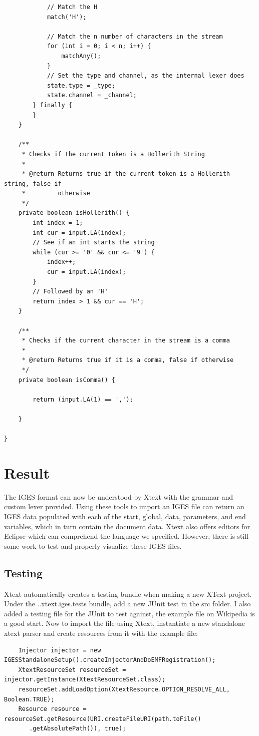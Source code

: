 \begin{Verbatim}
			// Match the H
			match('H');

			// Match the n number of characters in the stream
			for (int i = 0; i < n; i++) {
				matchAny();
			}
			// Set the type and channel, as the internal lexer does
			state.type = _type;
			state.channel = _channel;
		} finally {
		}
	}

	/**
	 * Checks if the current token is a Hollerith String
	 * 
	 * @return Returns true if the current token is a Hollerith string, false if
	 *         otherwise
	 */
	private boolean isHollerith() {
		int index = 1;
		int cur = input.LA(index);
		// See if an int starts the string
		while (cur >= '0' && cur <= '9') {
			index++;
			cur = input.LA(index);
		}
		// Followed by an 'H'
		return index > 1 && cur == 'H';
	}

	/**
	 * Checks if the current character in the stream is a comma
	 * 
	 * @return Returns true if it is a comma, false if otherwise
	 */
	private boolean isComma() {

		return (input.LA(1) == ',');

	}

}
\end{Verbatim}

\chapter{Result}

The IGES format can now be understood by Xtext with the grammar and custom lexer provided. Using these tools to import an IGES file can return an IGES data populated with each of the start, global, data, parameters, and end variables, which in turn contain the document data. Xtext also offers editors for Eclipse which can comprehend the language we specified. However, there is still some work to test and properly visualize these IGES files.

\section{Testing}

Xtext automatically creates a testing bundle when making a new XText project. Under the ..xtext.iges.tests bundle, add a new JUnit test in the src folder. I also added a testing file for the JUnit to test against, the example file on Wikipedia is a good start. Now to import the file using Xtext, instantiate a new standalone xtext parser and create resources from it with the example file:

\begin{Verbatim}
    Injector injector = new IGESStandaloneSetup().createInjectorAndDoEMFRegistration();
    XtextResourceSet resourceSet = injector.getInstance(XtextResourceSet.class);
    resourceSet.addLoadOption(XtextResource.OPTION_RESOLVE_ALL, Boolean.TRUE);
    Resource resource = resourceSet.getResource(URI.createFileURI(path.toFile()
       .getAbsolutePath()), true);
\end{Verbatim}

